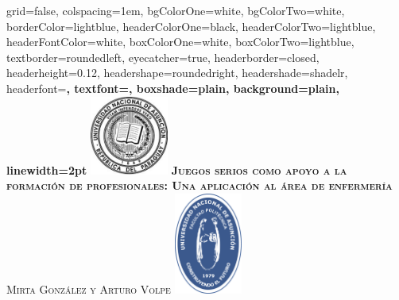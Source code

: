 \documentclass[portrait,final,a0paper,fontscale=0.277]{baposter}
\begin{document}
\begin{poster}%
  {
  grid=false,
  colspacing=1em,
  bgColorOne=white,
  bgColorTwo=white,
  borderColor=lightblue,
  headerColorOne=black,
  headerColorTwo=lightblue,
  headerFontColor=white,
  boxColorOne=white,
  boxColorTwo=lightblue,
  textborder=roundedleft,
  eyecatcher=true,
  headerborder=closed,
  headerheight=0.12\textheight,
  headershape=roundedright,
  headershade=shadelr,
  headerfont=\Large\bf\textsc, %
  textfont={\setlength{\parindent}{1.5em}},
  boxshade=plain,
  background=plain,
  linewidth=2pt
  }
  {\includegraphics[height=7em]{imagenes/logouna.png}} 
  {\bf\textsc{Juegos serios como apoyo a la formación de profesionales: Una aplicación al área de enfermería}\vspace{0.5em}}
  {\textsc{ Mirta González y Arturo Volpe }}
  {%
    \includegraphics[height=9em]{../util/logo.pdf}
  }

    \newcommand{\colouredcircle}{%
      \tikz{\useasboundingbox (-0.2em,-0.32em) rectangle(0.2em,0.32em);
          \draw[draw=black,fill=lightblue,line width=0.03em] (0,0) circle(0.18em);}\-\ }


\end{poster}
\end{document}
